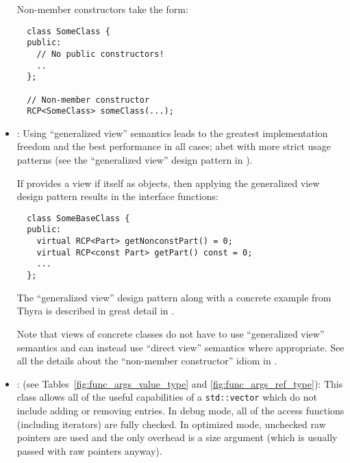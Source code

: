 \begin{itemize}
Non-member constructors take the form:

{\small\begin{verbatim}
  class SomeClass {
  public:
    // No public constructors!
    ..
  };

  // Non-member constructor
  RCP<SomeClass> someClass(...);
\end{verbatim}}


{}\item\GCGGeneralizedViews: Using ``generalized view'' semantics
leads to the greatest implementation freedom and the best performance
in all cases; abet with more strict usage patterns (see the
``generalized view'' design pattern in
{}\cite{TeuchosMemoryManagementGuide}).

If {} provides a view if itself as {}
objects, then applying the generalized view design pattern results in
the interface functions:

{\small\begin{verbatim}
  class SomeBaseClass {
  public:
    virtual RCP<Part> getNonconstPart() = 0;
    virtual RCP<const Part> getPart() const = 0;
    ...
  };
\end{verbatim}}

The ``generalized view'' design pattern along with a concrete example
from Thyra is described in great detail in
{}\cite{TeuchosMemoryManagementGuide}.

Note that views of concrete classes do not have to use ``generalized
view'' semantics and can instead use ``direct view'' semantics where
appropriate.  See all the details about the ``non-member constructor''
idiom in {}\cite{TeuchosMemoryManagementGuide}.


{}\item\GCGTeuchosArrayView: (see Tables~\ref{fig:func_args_value_type} and
{}\ref{fig:func_args_ref_type}): This class allows all of the useful
capabilities of a {}\texttt{std::vector} which do not include adding or
removing entries.  In debug mode, all of the access functions (including
iterators) are fully checked.  In optimized mode, unchecked raw pointers are
used and the only overhead is a size argument (which is usually passed with
raw pointers anyway).



\end{itemize}
